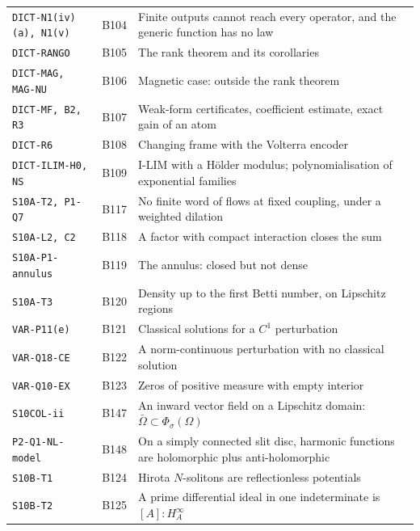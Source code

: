 \begin{center}
\begin{longtable}{@{}L{3.6cm}L{1.2cm}L{8.0cm}L{1.2cm}@{}}
\texttt{DICT-N1(iv)(a), N1(v)} & B104 & Finite outputs cannot reach every operator, and the generic function has no law & \pageref{dim:DICT-N1(iv)(a), N1(v)}\\
\texttt{DICT-RANGO} & B105 & The rank theorem and its corollaries & \pageref{dim:DICT-RANGO}\\
\texttt{DICT-MAG, MAG-NU} & B106 & Magnetic case: outside the rank theorem & \pageref{dim:DICT-MAG, MAG-NU}\\
\texttt{DICT-MF, B2, R3} & B107 & Weak-form certificates, coefficient estimate, exact gain of an atom & \pageref{dim:DICT-MF, B2, R3}\\
\texttt{DICT-R6} & B108 & Changing frame with the Volterra encoder & \pageref{dim:DICT-R6}\\
\texttt{DICT-ILIM-H0, NS} & B109 & I-LIM with a H\"older modulus; polynomialisation of exponential families & \pageref{dim:DICT-ILIM-H0, NS}\\
\texttt{S10A-T2, P1-Q7} & B117 & No finite word of flows at fixed coupling, under a weighted dilation & \pageref{dim:S10A-T2, P1-Q7}\\
\texttt{S10A-L2, C2} & B118 & A factor with compact interaction closes the sum & \pageref{dim:S10A-L2, C2}\\
\texttt{S10A-P1-annulus} & B119 & The annulus: closed but not dense & \pageref{dim:S10A-P1-annulus}\\
\texttt{S10A-T3} & B120 & Density up to the first Betti number, on Lipschitz regions & \pageref{dim:S10A-T3}\\
\texttt{VAR-P11(e)} & B121 & Classical solutions for a $C^1$ perturbation & \pageref{dim:VAR-P11(e)}\\
\texttt{VAR-Q18-CE} & B122 & A norm-continuous perturbation with no classical solution & \pageref{dim:VAR-Q18-CE}\\
\texttt{VAR-Q10-EX} & B123 & Zeros of positive measure with empty interior & \pageref{dim:VAR-Q10-EX}\\
\texttt{S10COL-ii} & B147 & An inward vector field on a Lipschitz domain: $\bar\Omega\subset\Phi_\sigma(\Omega)$ & \pageref{dim:S10COL-ii}\\
\texttt{P2-Q1-NL-model} & B148 & On a simply connected slit disc, harmonic functions are holomorphic plus anti-holomorphic & \pageref{dim:P2-Q1-NL-model}\\
\texttt{S10B-T1} & B124 & Hirota $N$-solitons are reflectionless potentials & \pageref{dim:S10B-T1}\\
\texttt{S10B-T2} & B125 & A prime differential ideal in one indeterminate is $[A]:H_A^\infty$ & \pageref{dim:S10B-T2}\\

\end{longtable}
\end{center}
